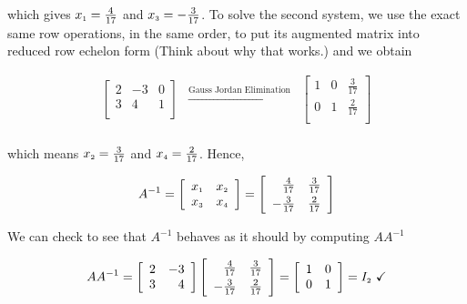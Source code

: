 which gives $x_{\mbox{\tiny$1$}} =  \frac{4}{17}$ and $x_{\mbox{\tiny$3$}} = -\frac{3}{17}$.  To solve the second system, we use the exact same row operations, in the same order, to put its augmented matrix into reduced row echelon form (Think about why that works.) and we obtain

\[ \begin{array}{ccc}

\left[ \begin{array}{rr|r} 2 & -3 & 0 \\ 3 & 4 & 1 \\ \end{array} \right] 
&
\xrightarrow{\text{Gauss Jordan Elimination}}

&
\left[ \begin{array}{rr|r} 1 & 0 & \frac{3}{17} \\[3pt] 0 & 1 & \frac{2}{17} \\ \end{array} \right] \\

\end{array}\]

which means $x_{\mbox{\tiny$2$}} = \frac{3}{17}$ and $x_{\mbox{\tiny$4$}} = \frac{2}{17}$.  Hence, 

\[  A^{-1} = \left[ \begin{array}{rr} x_{\mbox{\tiny$1$}} & x_{\mbox{\tiny$2$}} \\ x_{\mbox{\tiny$3$}} & x_{\mbox{\tiny$4$}} \\ \end{array} \right] = \left[ \begin{array}{rr} \frac{4}{17} & \frac{3}{17} \\[3pt]  -\frac{3}{17} & \frac{2}{17} \\ \end{array} \right]   \]

We can check to see that $A^{-1}$ behaves as it should by computing $AA^{-1}$

\[ AA^{-1} = \left[ \begin{array}{rr} 2 & -3 \\ 3 & 4 \\ \end{array} \right] \left[ \begin{array}{rr} \frac{4}{17} & \frac{3}{17} \\[3pt]  -\frac{3}{17} & \frac{2}{17} \\ \end{array} \right] = \left[ \begin{array}{rr} 1 & 0 \\ 0 & 1 \\ \end{array} \right] = I_{\mbox{\tiny$2$}} \, \, \checkmark\]

